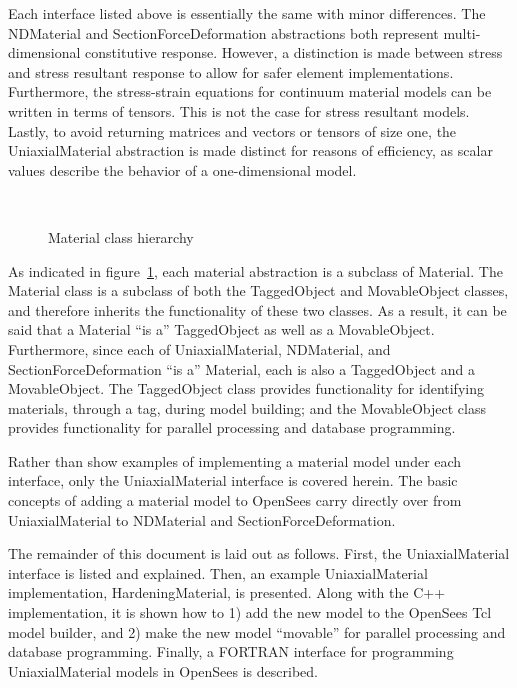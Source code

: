 \documentclass[12pt]{article}
\begin{document}
\noindent Each interface listed above is essentially the same with minor differences.
The NDMaterial and SectionForceDeformation abstractions both represent multi-dimensional
constitutive response. However, a distinction is made between stress and stress
\p resultant response to allow for safer element implementations. Furthermore, the
stress-strain equations for continuum material models can be written in terms of
tensors. This is not the case for stress resultant models. Lastly, to avoid returning
matrices and vectors or tensors of size one, the UniaxialMaterial abstraction is
made distinct for reasons of efficiency, as scalar values describe the behavior
of a one-dimensional model.

\begin{figure}[htpb]
\begin{center}
\leavevmode
\hbox{%
}
\end{center}
\caption{Material class hierarchy}
\label{fig:Material}
\end{figure}

As indicated in figure~\ref{fig:Material}, each material abstraction is a subclass of
Material. The Material class is a subclass of both
the TaggedObject and MovableObject classes, and therefore inherits the functionality
of these two classes. As a result, it can be said that a
Material ``is a'' TaggedObject as well as a MovableObject. Furthermore, since each of
UniaxialMaterial, NDMaterial, and SectionForceDeformation ``is a'' Material, each is
also a TaggedObject and a MovableObject. The TaggedObject class provides functionality
for identifying materials, through a tag, during model building; and the MovableObject
class provides functionality for parallel processing and database programming.

Rather than show examples of implementing a material model under each interface, only the
UniaxialMaterial interface is covered herein. The basic concepts of adding a material
model to OpenSees carry directly over from UniaxialMaterial
to NDMaterial and SectionForceDeformation.

The remainder of this document is laid out as follows. First, the UniaxialMaterial
interface is listed and explained. Then, an example UniaxialMaterial
implementation, HardeningMaterial, is presented. Along with the C++ implementation,
it is shown how to 1) add the new model to the OpenSees Tcl model builder, and 2)
make the new model ``movable'' for parallel processing and database programming.
Finally, a FORTRAN interface for programming UniaxialMaterial models in OpenSees
is described.
\end{document}
